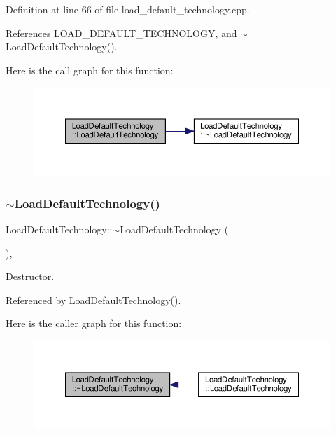 Definition at line 66 of file load\+\_\+default\+\_\+technology.\+cpp.



References L\+O\+A\+D\+\_\+\+D\+E\+F\+A\+U\+L\+T\+\_\+\+T\+E\+C\+H\+N\+O\+L\+O\+GY, and $\sim$\+Load\+Default\+Technology().

Here is the call graph for this function\+:
\nopagebreak
\begin{figure}[H]
\begin{center}
\leavevmode
\includegraphics[width=350pt]{d2/d1e/classLoadDefaultTechnology_a0f81733b532c34d8df466741a3e8dd82_cgraph}
\end{center}
\end{figure}
\mbox{\label{classLoadDefaultTechnology_a214186318c11cfe41727e61323efc677}} 
\subsubsection{\texorpdfstring{$\sim$\+Load\+Default\+Technology()}{~LoadDefaultTechnology()}}
{\footnotesize\ttfamily Load\+Default\+Technology\+::$\sim$\+Load\+Default\+Technology (\begin{DoxyParamCaption}{ }\end{DoxyParamCaption})\hspace{0.3cm}{\ttfamily [override]}, {\ttfamily [default]}}



Destructor. 



Referenced by Load\+Default\+Technology().

Here is the caller graph for this function\+:
\nopagebreak
\begin{figure}[H]
\begin{center}
\leavevmode
\includegraphics[width=350pt]{d2/d1e/classLoadDefaultTechnology_a214186318c11cfe41727e61323efc677_icgraph}
\end{center}
\end{figure}


